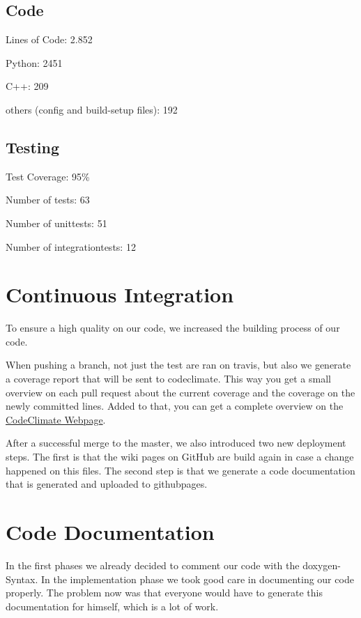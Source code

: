 \documentclass[parskip=full]{scrartcl}
\begin{document}
\subsection{Code}
Lines of Code: 2.852

Python: 2451

C++: 209

others (config and build-setup files): 192

\subsection{Testing}

Test Coverage: 95\%

Number of tests: 63

Number of \glspl{unittest}: 51

Number of \glspl{integrationtest}: 12

\newpage

\section{Continuous Integration}

To ensure a high quality on our code, we increased the building process of our code.

When pushing a branch, not just the test are ran on \gls{travis}, but also we generate a coverage report that will be sent to \gls{codeclimate}.
This way you get a small overview on each pull request about the current coverage and the coverage on the newly committed lines.
Added to that, you can get a complete overview on the
\href{https://codeclimate.com/github/TheSlimvReal/PSE---LA-meets-ML}{CodeClimate Webpage}.

After a successful merge to the master, we also introduced two new deployment steps.
The first is that the wiki pages on GitHub are build again in case a change happened on this files.
The second step is that we generate a code documentation that is generated and uploaded to \gls{githubpages}.

\newpage



\section{Code Documentation}

In the first phases we already decided to comment our code with the \gls{doxygen}-Syntax.
In the implementation phase we took good care in documenting our code properly.
The problem now was that everyone would have to generate this documentation for himself, which is a lot of work.
\end{document}
